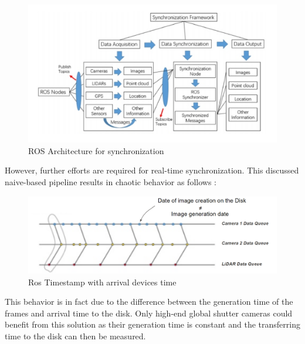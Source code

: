 \documentclass[english, LaM, oneside]{sapthesis}%
\begin{document}
\begin{figure}[h] %
    \centering
    \includegraphics[width=\linewidth]{Images/ros framework.png}
    \caption{ROS Architecture for synchronization}
    \label{fig:ros}
\end{figure}

However, further efforts are required for real-time synchronization. This discussed naive-based pipeline results in chaotic behavior as follows :

\begin{figure}[h] %
    \centering
    \includegraphics[width=\linewidth]{Images/trasnmitting delays.png}
    \caption{Ros Timestamp with arrival devices time}
    \label{fig:strangeb}
\end{figure}
    
This behavior is in fact due to the difference between the generation time of the frames and arrival time to the disk. Only high-end global shutter cameras could benefit from this solution as their generation time is constant and the transferring time to the disk can then be measured.
\end{document}
